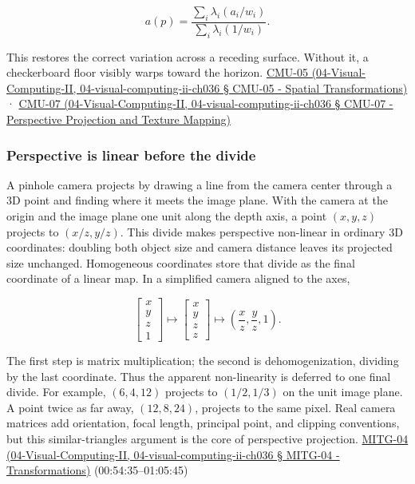 \[
a(p)=\frac{\sum_i\lambda_i(a_i/w_i)}{\sum_i\lambda_i(1/w_i)}.
\]

This restores the correct variation across a receding surface. Without it, a checkerboard floor visibly warps toward the horizon. \href{}{CMU-05 (04-Visual-Computing-II, 04-visual-computing-ii-ch036 § CMU-05 - Spatial Transformations)} · \href{}{CMU-07 (04-Visual-Computing-II, 04-visual-computing-ii-ch036 § CMU-07 - Perspective Projection and Texture Mapping)}

\subsubsection{Perspective is linear before the divide}\label{perspective-is-linear-before-the-divide}

A pinhole camera projects by drawing a line from the camera center through a 3D point and finding where it meets the image plane. With the camera at the origin and the image plane one unit along the depth axis, a point \((x,y,z)\) projects to \((x/z,y/z)\). This divide makes perspective non-linear in ordinary 3D coordinates: doubling both object size and camera distance leaves its projected size unchanged. Homogeneous coordinates store that divide as the final coordinate of a linear map. In a simplified camera aligned to the axes,

\[
\begin{bmatrix}x\\y\\z\\1\end{bmatrix}
\longmapsto
\begin{bmatrix}x\\y\\z\\z\end{bmatrix}
\longmapsto
\left(\frac{x}{z},\frac{y}{z},1\right).
\]

The first step is matrix multiplication; the second is dehomogenization, dividing by the last coordinate. Thus the apparent non-linearity is deferred to one final divide. For example, \((6,4,12)\) projects to \((1/2,1/3)\) on the unit image plane. A point twice as far away, \((12,8,24)\), projects to the same pixel. Real camera matrices add orientation, focal length, principal point, and clipping conventions, but this similar-triangles argument is the core of perspective projection. \href{}{MITG-04 (04-Visual-Computing-II, 04-visual-computing-ii-ch036 § MITG-04 - Transformations)} (00:54:35--01:05:45)

